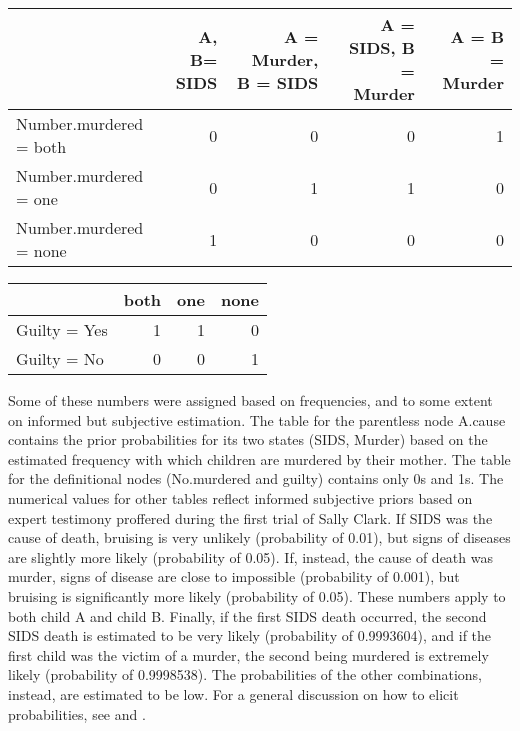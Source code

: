 \documentclass{article}
\begin{document}
\begin{table}[H]
\centering
\footnotesize
\begin{tabular}{lrrrr}
\toprule
  &\tiny  A, B= SIDS &\tiny   A = Murder, B = SIDS & \tiny  A = SIDS, B = Murder & \tiny  A = B = Murder\\
\midrule
\tiny Number.murdered = both & 0 & 0 & 0 & 1\\
\tiny Number.murdered = one & 0 & 1 & 1 & 0\\
\tiny Number.murdered = none & 1 & 0 & 0 & 0\\
\bottomrule
\end{tabular}
\end{table}

\begin{table}[H]
\centering
\begin{tabular}{lrrr}
\toprule
  & both & one & none\\
\midrule
Guilty = Yes & 1 & 1 & 0\\
Guilty = No & 0 & 0 & 1\\
\bottomrule
\end{tabular}
\end{table}

\noindent
Some of these numbers were assigned based on frequencies, and to some extent on  informed but subjective
estimation. 
The table for the 
parentless node \textsf{A.cause} 
contains the prior
probabilities for its two states (SIDS, Murder) based on 
the estimated frequency with which children are murdered by their mother. 
The table for the definitional
nodes \linebreak  (\textsf{No.murdered} and \textsf{guilty}) contains only 0s and 1s. The numerical values for other tables reflect informed subjective priors based on expert testimony proffered during the first trial of Sally Clark. If SIDS was the cause of death, bruising is very unlikely (probability of 0.01), but signs of diseases are slightly more likely (probability of 0.05). If, instead, the cause of death was murder, signs of disease are close to impossible (probability of 0.001), but bruising is significantly more likely (probability of 0.05). These numbers apply to both child A and child B. Finally,
if the first SIDS death occurred, the second SIDS death is estimated to be very likely (probability of 0.9993604), and if the first child was the victim of a murder, the second being murdered is extremely likely (probability of 0.9998538).
The probabilities of the other combinations, instead, are estimated to be low. 
For a general discussion on how to elicit probabilities, see
\citep{renooij2001ProbabilityElicitationBeliefa} and
\citep{gaag2013elicit}.
\end{document}
